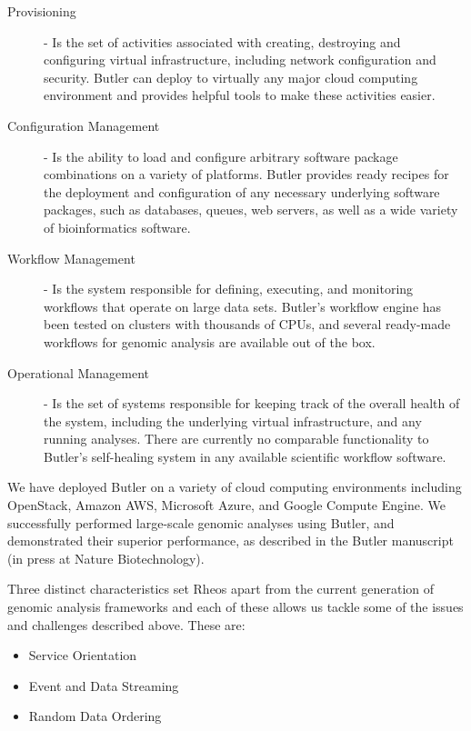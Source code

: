 \begin{description}
    \item [Provisioning] - Is the set of activities associated with creating, destroying and configuring virtual infrastructure, including network configuration and security. Butler can deploy to virtually any major cloud computing environment and provides helpful tools to make these activities easier.
    \item [Configuration Management] - Is the ability to load and configure arbitrary software package combinations on a variety of platforms. Butler provides ready recipes for the deployment and configuration of any necessary underlying software packages, such as databases, queues, web servers, as well as a wide variety of bioinformatics software. 
    \item [Workflow Management] - Is the system responsible for defining, executing, and monitoring workflows that operate on large data sets. Butler's workflow engine has been tested on clusters with thousands of CPUs, and several ready-made workflows for genomic analysis are available out of the box.
    \item [Operational Management] - Is the set of systems responsible for keeping track of the overall health of the system, including the underlying virtual infrastructure, and any running analyses. There are currently no comparable functionality to Butler's self-healing system in any available scientific workflow software.
\end{description}

We have deployed Butler on a variety of cloud computing environments including OpenStack, Amazon AWS, Microsoft Azure, and Google Compute Engine. We successfully performed large-scale genomic analyses using Butler, and demonstrated their superior performance, as described in the Butler manuscript\autocite{yakneen2017enabling} (in press at Nature Biotechnology).

Three distinct characteristics set Rheos apart from the current generation of genomic analysis frameworks and each of these allows us tackle some of the issues and challenges described above. These are:

\begin{itemize}
\item Service Orientation
\item Event and Data Streaming
\item Random Data Ordering
\end{itemize}

